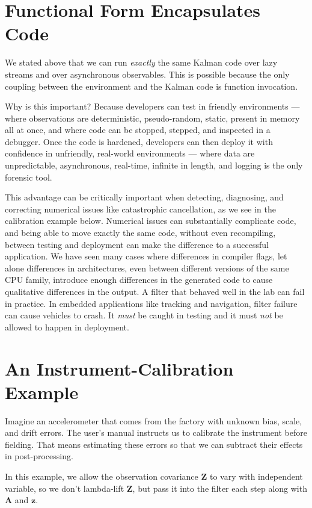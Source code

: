 \documentclass[10pt,oneside,x11names]{article}
\begin{document}
\section{Functional Form Encapsulates Code}
\label{sec:orgheadline21}

We stated above that we can run \emph{exactly} the same Kalman code over lazy streams
and over asynchronous observables. This is possible because the only coupling
between the environment and the Kalman code is function invocation.

Why is this important? Because developers can test in friendly environments ---
where observations are deterministic, pseudo-random, static, present in memory
all at once, and where code can be stopped, stepped, and inspected in a
debugger. Once the code is hardened, developers can then deploy it with
confidence in unfriendly, real-world environments --- where data are
unpredictable, asynchronous, real-time, infinite in length, and logging is the
only forensic tool.

This advantage can be critically important when detecting, diagnosing, and
correcting numerical issues like catastrophic cancellation, as we see in the
calibration example below. Numerical issues can substantially complicate code,
and being able to move exactly the same code, without even recompiling, between
testing and deployment can make the difference to a successful application. We
have seen many cases where differences in compiler flags, let alone differences
in architectures, even between different versions of the same CPU family,
introduce enough differences in the generated code to cause qualitative
differences in the output. A filter that behaved well in the lab can fail in practice. In
embedded applications like tracking and navigation, filter failure can cause
vehicles to crash. It \emph{must} be caught in testing and it must \emph{not} be allowed
to happen in deployment.

\section{An Instrument-Calibration Example}
\label{sec:orgheadline26}

Imagine an accelerometer that comes from the factory with unknown bias, scale,
and drift errors. The user's manual instructs us to calibrate the instrument
before fielding. That means estimating these errors so that we can subtract
their effects in post-processing.

In this example, we allow the observation covariance \(\mathbold{Z}\) to vary with
independent variable, so we don't lambda-lift \(\mathbold{Z}\), but pass it into
the filter each step along with \(\mathbold{A}\) and \(\mathbold{z}\).
\end{document}
